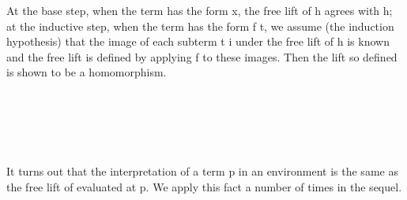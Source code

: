 \fi
\ifshort\else
At the base step, when the term has the form 
\ab x, the free lift of \ab h agrees with \ab h; at the inductive step, when the
term has the form  \ab f \ab t, we assume (the induction hypothesis)
that the image of each subterm \ab t \ab i under the free lift of \ab h is known
and the free lift is defined by applying \ab f   to these images.
\fi
Then the lift so defined is shown to be a homomorphism.

\begin{code}%
\>[0]\<%
\\
\>[0][@{}l@{\AgdaIndent{1}}]%
\>[1]\AgdaSpace{}%
\AgdaSymbol{:}\AgdaSpace{}%
\AgdaSpace{}%
\AgdaSymbol{(}\AgdaSpace{}%
\AgdaSymbol{)}\AgdaSpace{}%
\<%
\\
%
\>[1]\AgdaSpace{}%
\AgdaSymbol{=}\AgdaSpace{}%
\AgdaSpace{}%
\AgdaOperator{\AgdaInductiveConstructor{,}}\<%
\\
\>[1][@{}l@{\AgdaIndent{0}}]%
\>[3]\AgdaSpace{}%
\AgdaBound{\AgdaUnderscore{}}\AgdaSymbol{\}\{}\AgdaSymbol{\}}\AgdaSpace{}%
\AgdaSpace{}%
\AgdaSpace{}%
\AgdaSymbol{(}\AgdaSpace{}%
\AgdaSymbol{)}\AgdaSpace{}%
\AgdaSymbol{(}\AgdaSpace{}%
\AgdaOperator{\AgdaInductiveConstructor{,}}\AgdaSpace{}%
\AgdaSpace{}%
\AgdaSpace{}%
\AgdaSpace{}%
\AgdaSymbol{(}\AgdaSpace{}%
\AgdaSymbol{)\{}\AgdaSpace{}%
\AgdaSymbol{\}}\AgdaSpace{}%
\AgdaSymbol{)))}\<%
\\
\>[0]\<%
\end{code}

It turns out that the interpretation of a term \ab p in an environment  is the same
as the free lift of  evaluated at \ab p. We apply this fact a number of times in the sequel.

